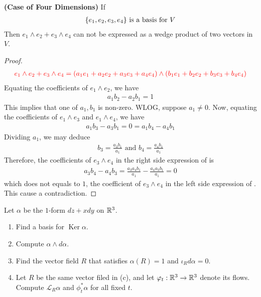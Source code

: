 \documentclass{report}
\begin{document}
\begin{theorem}
\textbf{(Case of Four Dimensions)} If 
\begin{align*}
\{ e_1,e_2,e_3,e_4 \}\text{ is a basis for }V
\end{align*}
Then $e_1 \wedge  e_2 +e_3 \wedge  e_4 $ can not be expressed as a wedge product of two vectors in $V$. 
\end{theorem}
\begin{proof}
 \begin{align}
\label{gi}
 \textcolor{red}{e_1 \wedge  e_2 + e_3 \wedge  e_4  = (a_1e_1+a_2e_2+a_3e_3+a_4e_4) \wedge  (b_1e_1+b_2e_2+b_3e_3+b_4e_4)}
\end{align}
Equating the coefficients of $e_1 \wedge  e_2$, we have  
\begin{align*}
  a_1b_2-a_2b_1 =1
\end{align*}
This implies that one of $a_1,b_1$ is non-zero. WLOG, suppose  $a_1\neq 0$. Now, equating the coefficients of $e_1 \wedge  e_3$ and $e_1 \wedge  e_4$, we have 
\begin{align*}
a_1b_3-a_3b_1=0=a_1b_4-a_4b_1
\end{align*}
Dividing $a_1$, we may deduce 
 \begin{align*}
b_3= \frac{a_3b_1}{a_1} \text{ and }b_4= \frac{a_4b_1}{a_1}
\end{align*}
Therefore, the coefficients of $e_3 \wedge  e_4$ in the right side expression of  is 
\begin{align*}
a_3b_4-a_4b_3= \frac{a_3a_4b_1}{a_1}- \frac{a_4a_3b_1}{a_1}=0
\end{align*}
which does not equals to $1$, the coefficient of $e_3 \wedge  e_4$ in the left side expression of . This cause a contradiction. 
\end{proof}
\begin{question}{}{}
Let $\alpha $ be the $1$-form  $dz+xdy$  on  $\mathbb{R}^3$. 
 \begin{enumerate}[label=(\alph*)]
  \item Find a basis for $\operatorname{Ker}\alpha $. 
  \item Compute $\alpha \wedge  d\alpha  $. 
  \item Find the vector field  $R$ that satisfies  $\alpha (R)=1$ and $\iota_R d\alpha =0$.
  \item Let $R$ be the same vector filed in  (c), and let  $\varphi_t:\mathbb{R}^3 \rightarrow \mathbb{R}^3$ denote its flows. Compute $\mathcal{L}_R\alpha $ and $\phi_t^*\alpha  $ for all fixed $t$.  
\end{enumerate}
\end{question}
\end{document}
